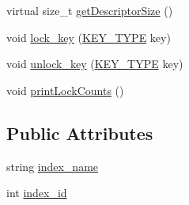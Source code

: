 \begin{DoxyCompactItemize}
\item 
virtual size\+\_\+t \hyperlink{classindex__base_a0050e83a568a2905c54c81d7515f4085}{get\+Descriptor\+Size} ()
\item 
void \hyperlink{classindex__base_aa1e0da4c7da2fc75201d567a007cf746}{lock\+\_\+key} (\hyperlink{index__base_8h_ae35c40bc2f912c11f0e36ac66cba4489}{K\+E\+Y\+\_\+\+T\+Y\+PE} key)
\item 
void \hyperlink{classindex__base_a6907aa960cab70f4693bf10891efa0b8}{unlock\+\_\+key} (\hyperlink{index__base_8h_ae35c40bc2f912c11f0e36ac66cba4489}{K\+E\+Y\+\_\+\+T\+Y\+PE} key)
\item 
void \hyperlink{classindex__base_ad8ff262d6b034e6de86651ef8f736cbb}{print\+Lock\+Counts} ()
\end{DoxyCompactItemize}
\subsection*{Public Attributes}
\begin{DoxyCompactItemize}
\item 
string \hyperlink{classindex__base_aa6f9ab0da3c1a5f3b1313961300724be}{index\+\_\+name}
\item 
int \hyperlink{classindex__base_ac74f658497f2950116acf136099eb980}{index\+\_\+id}
\end{DoxyCompactItemize}
